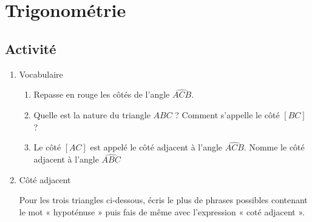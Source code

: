 \documentclass[a4paper,10pt]{report}
\begin{document}
\pagestyle{empty}
\newpage
\section*{Trigonométrie}

\subsection*{Activité}

\begin{minipage}{12cm}
\begin{enumerate}
\item Vocabulaire
\begin{enumerate}
\item Repasse en rouge les côtés de l'angle $\widehat{ACB}$.
\item Quelle est la nature du triangle $ABC$ ? Comment s'appelle le côté $[BC]$ ?
\item Le côté $[AC]$ est appelé le côté adjacent à l'angle $\widehat{ACB}$. Nomme le côté adjacent à l'angle $\widehat{ABC}$
\end{enumerate}
\item Côté adjacent

\noindent Pour les trois triangles ci-dessous, écris le plus de phrases possibles contenant le mot « hypoténuse » puis fais de même avec l'expression « coté adjacent ».
\end{enumerate}
\end{minipage}
\end{document}
